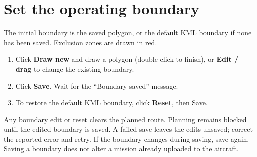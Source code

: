 \documentclass[11pt]{article}
\begin{document}
\section{Set the operating boundary}
The initial boundary is the saved polygon, or the default KML boundary if none
has been saved. Exclusion zones are drawn in red.
\begin{enumerate}[leftmargin=1.6em]
  \item Click \textbf{Draw new} and draw a polygon (double-click to finish), or
    \textbf{Edit / drag} to change the existing boundary.
  \item Click \textbf{Save}. Wait for the ``Boundary saved'' message.
  \item To restore the default KML boundary, click \textbf{Reset}, then Save.
\end{enumerate}
Any boundary edit or reset clears the planned route. Planning remains blocked
until the edited boundary is saved. A failed save leaves the edits unsaved; correct
the reported error and retry. If the boundary changes during saving, save again.
Saving a boundary does not alter a mission already uploaded to the aircraft.
\end{document}
